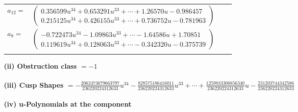 \documentclass[1p]{elsarticle_modified}
\theoremstyle{definition}
\begin{document}
\begin{tabular}{m{7pt} m{180pt} m{7pt} m{180pt} }
\flushright $a_{12}=$&$\begin{pmatrix}0.356599 u^{34}+0.653291 u^{33}+\cdots+1.26570 u-0.986457\\0.215125 u^{34}+0.426155 u^{33}+\cdots+0.736752 u-0.781963\end{pmatrix}$ \\
\flushright $a_{8}=$&$\begin{pmatrix}-0.722473 u^{34}-1.09863 u^{33}+\cdots-1.64586 u+1.70851\\0.119619 u^{34}+0.128063 u^{33}+\cdots-0.342320 u-0.375739\end{pmatrix}$\\&\end{tabular}
\flushleft \textbf{(ii) Obstruction class $= -1$}\\~\\
\flushleft \textbf{(iii) Cusp Shapes $= -\frac{2062473679663797}{236220224312633} u^{34}-\frac{828575186416011}{236220224312633} u^{33}+\cdots+\frac{1259833306856340}{236220224312633} u-\frac{231203744342586}{236220224312633}$}\\~\\
\newpage\renewcommand{\arraystretch}{1}
\flushleft \textbf{(iv) u-Polynomials at the component}\newline \\
\end{document}
